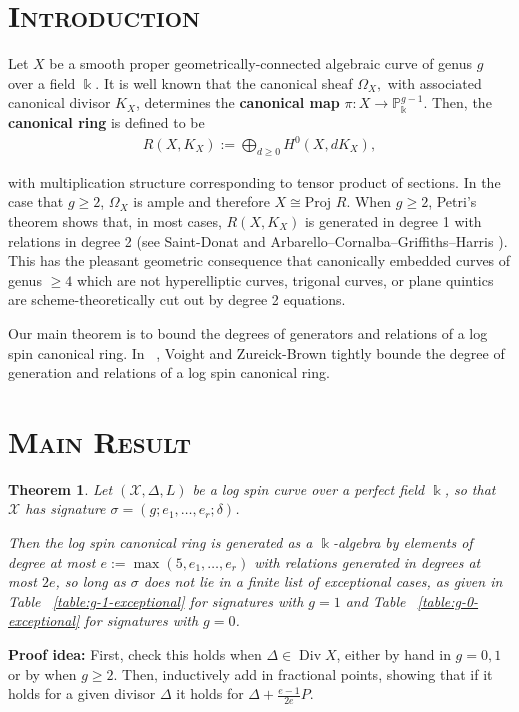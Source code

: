 \documentclass[landscape, a0, largefonts]{sciposter}
\theoremstyle{plain}
\newtheorem{thm}{Theorem}
\theoremstyle{definition}
\theoremstyle{remark}
\newcommand\BP{{\mathbb P}}
\newcommand\Bk{{\Bbbk}}
\newcommand\proj{\text{Proj }}
\DeclareMathOperator\di{Div}
\newcommand\sx{\mathscr X}
\newcommand{\halfcan}{L}
\begin{document}
\begin{multicols}{3}
  \section*{\textsc{Introduction}}

  
Let $X$ be a smooth proper geometrically-connected algebraic curve of genus $g$ over a field $\Bk$.
It is well known that the canonical sheaf $\Omega _X,$ with
associated canonical divisor $K_X$, determines the {\bf canonical
map } $\pi: X \rightarrow \BP_\Bk^{g - 1}$. Then, the {\bf canonical
ring} is defined to be
\begin{align*}
	R(X, K_X) := \bigoplus_{d \geq 0} H^0(X, dK_X),
\end{align*}

\noindent
with multiplication structure corresponding to tensor product of
sections. In the case that $g \geq 2$, $\Omega_X$ is ample and
therefore $X \cong \proj R$. When $g \geq 2$, Petri's theorem 
shows that, in most cases, $R(X, K_X)$
is generated in degree 1 with relations in degree 2 (see
Saint-Donat \cite[p. 157]{saint-donat:proj} and Arbarello--Cornalba--Griffiths--Harris
\cite[Section 3.3]{acgh:algebraic-curves}). This has the pleasant 
geometric consequence that canonically embedded curves of genus $\geq 4$ which are not hyperelliptic curves, trigonal curves, or plane quintics are scheme-theoretically cut out by degree 2 equations.

Our main theorem is to bound the degrees of generators and
relations of a log spin canonical ring. In 
~\cite[Theorem 1.4]{vzb:stacky}, Voight and Zureick-Brown tightly
bounde the degree of generation and
relations of a log spin canonical ring.



  \section*{\textsc{Main Result}}


\begin{thm}
\label{thm:main}
Let $(\sx, \Delta, \halfcan)$ be a log spin curve over a perfect
field $\Bk$, so that $\sx$ has signature $\sigma = (g; e_1, \ldots,
e_r; \delta)$.

Then the log spin canonical ring is generated as a $\Bk$-algebra by 
elements of degree at most $e := \max(5, e_1, \ldots, e_r)$ with
relations generated in degrees at most $2e$,
so long as $\sigma$ does not lie in a finite list of exceptional
cases, as given in Table ~\ref{table:g-1-exceptional} for
signatures with $g = 1$ and Table ~\ref{table:g-0-exceptional} for
signatures with $g = 0$.
\end{thm}
{\bf Proof idea:} First, check this holds when $\Delta \in \di X$,
either by hand in $g = 0, 1$ or by 
\cite[$\mathsection$ 6]{milnor:fractional-weight} when $g \geq 2$.
Then, inductively add in fractional points, showing that if
it holds for a given divisor $\Delta$ it holds for
$\Delta + \frac{e-1}{2e}P$.



\end{multicols}
\end{document}
